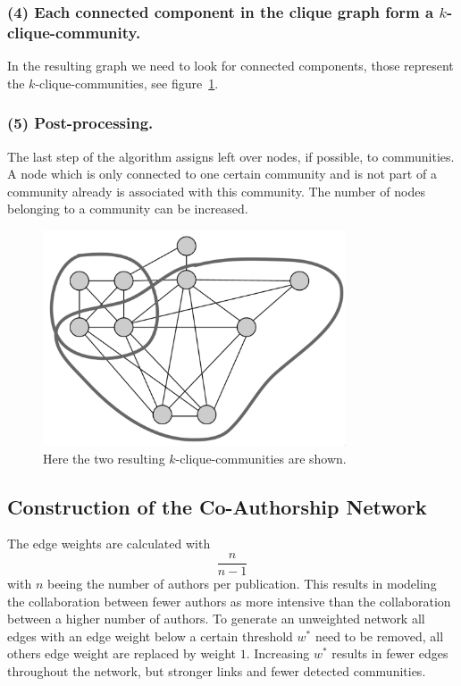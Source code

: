 \documentclass[runningheads,a4paper]{llncs}
\begin{document}
\subsubsection{(4) Each connected component in the clique graph form a $k$-clique-community.}
In the resulting graph we need to look for connected components, those represent the $k$-clique-communities, see figure~\ref{fig:final}.

\subsubsection{(5) Post-processing.}
The last step of the algorithm assigns left over nodes, if possible, to communities. A node which is only connected to one certain community and is not part of a community already is associated with this community. The number of nodes belonging to a community can be increased.

\begin{figure}
\begin{center}
	\includegraphics[width=0.8\textwidth]{img/final}
		\caption{Here the two resulting $k$-clique-communities are shown.}
		\label{fig:final}
\end{center}
\end{figure}


\subsection{Construction of the Co-Authorship Network}
\label{cpm-construction}
The edge weights are calculated with $$\frac{n}{n-1}$$ with $n$ beeing the number of authors per publication.
This results in modeling the collaboration between fewer authors as more intensive than the collaboration between a higher number of authors.  
To generate an unweighted network all edges with an edge weight below a certain threshold $w^*$ need to be removed, all others edge weight are replaced by weight $1$. Increasing $w^*$ results in fewer edges throughout the network, but stronger links and fewer detected communities.
\end{document}
